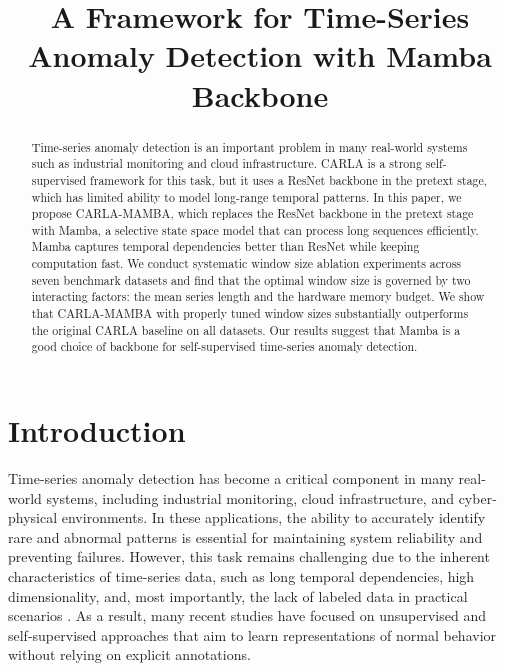 \documentclass[runningheads]{llncs}
\begin{document}
\title{A Framework for Time-Series Anomaly Detection with Mamba Backbone}




\maketitle
\begin{abstract}
Time-series anomaly detection is an important problem in many real-world systems such as industrial monitoring and cloud infrastructure. CARLA is a strong self-supervised framework for this task, but it uses a ResNet backbone in the pretext stage, which has limited ability to model long-range temporal patterns. In this paper, we propose CARLA-MAMBA, which replaces the ResNet backbone in the pretext stage with Mamba, a selective state space model that can process long sequences efficiently. Mamba captures temporal dependencies better than ResNet while keeping computation fast. We conduct systematic window size ablation experiments across seven benchmark datasets and find that the optimal window size is governed by two interacting factors: the mean series length and the hardware memory budget. We show that CARLA-MAMBA with properly tuned window sizes substantially outperforms the original CARLA baseline on all datasets. Our results suggest that Mamba is a good choice of backbone for self-supervised time-series anomaly detection.
\end{abstract}

\section{Introduction}
\label{sec:introduction}

Time-series anomaly detection has become a critical component in many real-world systems, including industrial monitoring, cloud infrastructure, and cyber-physical environments. In these applications, the ability to accurately identify rare and abnormal patterns is essential for maintaining system reliability and preventing failures. However, this task remains challenging due to the inherent characteristics of time-series data, such as long temporal dependencies, high dimensionality, and, most importantly, the lack of labeled data in practical scenarios \cite{darban2022deep}. As a result, many recent studies have focused on unsupervised and self-supervised approaches that aim to learn representations of normal behavior without relying on explicit annotations.
\end{document}
